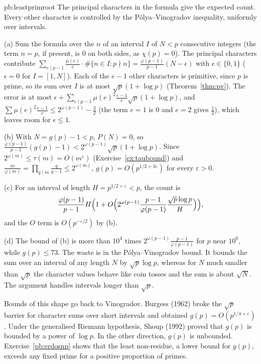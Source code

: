 \begin{solution}{pb:leastprimroot}
\idea The principal characters in the formula give the expected count. Every other character is controlled by the Pólya--Vinogradov inequality, uniformly over intervals.

\writeup (a) Sum the formula over the $n$ of an interval $I$ of $N<p$ consecutive integers (the term $n=p$, if present, is $0$ on both sides, as $\chi(p)=0$). The principal characters contribute
$\sum_{e\mid p-1}\frac{\mu(e)}e\cdot\#\{n\in I:p\nmid n\}=\frac{\varphi(p-1)}{p-1}(N-\epsilon)$ with $\epsilon\in\{0,1\}$ ($\epsilon=0$ for $I=[1,N]$). Each of the $e-1$ other characters is
primitive, since $p$ is prime, so its sum over $I$ is at most $\sqrt p(1+\log p)$ (Theorem~\ref{thm:pv}). The error is at most
$\epsilon+\sum_{e\mid p-1}\mu(e)^2\frac{e-1}e\sqrt p(1+\log p)$, and $\sum\mu(e)^2\frac{e-1}e\le2^{\omega(p-1)}-\frac32$ (the term $e=1$ is $0$ and $e=2$ gives $\frac12$), which leaves room for $\epsilon\le1$.

(b) With $N=g(p)-1<p$, $P(N)=0$, so $\frac{\varphi(p-1)}{p-1}(g(p)-1)<2^{\omega(p-1)}\sqrt p(1+\log p)$. Since $2^{\omega(m)}\le\tau(m)=O(m^\varepsilon)$ (Exercise~\ref{ex:taubound}) and
$\frac m{\varphi(m)}=\prod_{q\mid m}\frac q{q-1}\le2^{\omega(m)}$, $g(p)=O(p^{1/2+3\varepsilon})$ for every $\varepsilon>0$.

(c) For an interval of length $H=p^{1/2+\varepsilon}<p$, the count is
\[
\frac{\varphi(p-1)}{p-1}H\Bigl(1+O\Bigl(2^{\omega(p-1)}\frac{p-1}{\varphi(p-1)}\frac{\sqrt p\log p}H\Bigr)\Bigr),
\]
and the $O$ term is
$O(p^{-\varepsilon/2})$ by (b).

(d) The bound of (b) is more than $10^4$ times $2^{\omega(p-1)}\frac{p-1}{\varphi(p-1)}$ for $p$ near $10^6$, while $g(p)\le73$. The waste is in the Pólya--Vinogradov bound. It bounds the sum over an
interval of any length $N$ by $\sqrt p\log p$, whereas for $N$ much smaller than $\sqrt p$ the character values behave like coin tosses and the sum is about $\sqrt N$. The argument handles intervals longer than $\sqrt p$.


\leads Bounds of this shape go back to Vinogradov. Burgess (1962) broke the $\sqrt p$ barrier for character sums over short intervals and obtained
$g(p)=O(p^{1/4+\varepsilon})$. Under the generalised Riemann hypothesis, Shoup (1992) proved that $g(p)$ is bounded by a power of $\log p$. In the other direction, $g(p)$ is
unbounded. Exercise~\ref{pb:erdosnp} shows that the least non-residue, a lower bound for $g(p)$, exceeds any fixed prime for a positive proportion of primes.
\end{solution}


